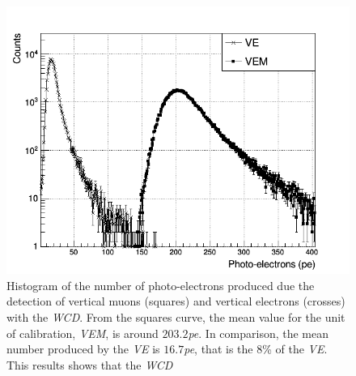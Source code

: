 \documentclass[submitting]{nst}
\begin{document}
\begin{figure}
    \centering
    \includegraphics[scale=0.38]{Figures/vem_ve.png}
    \caption{Histogram of the number of photo-electrons produced due the detection of vertical muons (squares) and vertical electrons (crosses) with the \textsl{WCD}. From the squares curve, the mean value for the unit of calibration, \textsl{VEM}, is around $203.2$\textsl{pe}. In comparison, the mean number produced by the \textsl{VE} is $16.7$\textsl{pe}, that is the $8$\% of the \textsl{VE}. This results shows that the \textsl{WCD} }
    \label{vem_ve}
\end{figure}
\end{document}
